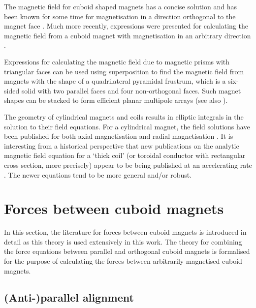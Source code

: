 \documentclass[11pt,a4paper]{memoir}
\begin{document}
The magnetic field for cuboid shaped magnets has a concise solution and has been known for some time for magnetisation in a direction orthogonal to the magnet face \cite{akoun1984}.
Much more recently, expressions were presented for calculating the magnetic field from a cuboid magnet with magnetisation in an arbitrary direction \cite{ravaud2009-pier98}.

Expressions for calculating the magnetic field due to magnetic prisms with triangular faces \cite{compter2010-ietm,janssen2010-compel,rubeck2013-ietm} can be used using superposition to find the magnetic field from magnets with the shape of a quadrilateral pyramidal frustrum, which is a six-sided solid with two parallel faces and four non-orthogonal faces.
Such magnet shapes can be stacked to form efficient planar multipole arrays \cite{janssen2009-ietm} (see also ).

The geometry of cylindrical magnets and coils results in elliptic integrals in the solution to their field equations.
For a cylindrical magnet, the field solutions have been published for both axial magnetisation \cite{ravaud2010-ietm} and radial magnetisation \cite{furlani1995-ietm}.
It is interesting from a historical perspective that new publications on the analytic magnetic field equation for a `thick coil' (or toroidal conductor with rectangular cross section, more precisely) appear to be being published at an accelerating rate \cite{danilov1971-nim,urankar1982-ietm,babic1988-ietm,azzerboni1993-ietm,labinac2006-ajp,pechenkov2006-rndt,ravaud2010-emwaves,zhang2012-ietm}.
The newer equations tend to be more general and/or robust.



\section{Forces between cuboid magnets}

In this section, the literature for forces between cuboid magnets is introduced in detail as this theory is used extensively in this work.
The theory for combining the force equations between parallel and orthogonal cuboid magnets is formalised for the purpose of calculating the forces between arbitrarily magnetised cuboid magnets.

\subsection{(Anti-)parallel alignment}
\end{document}
